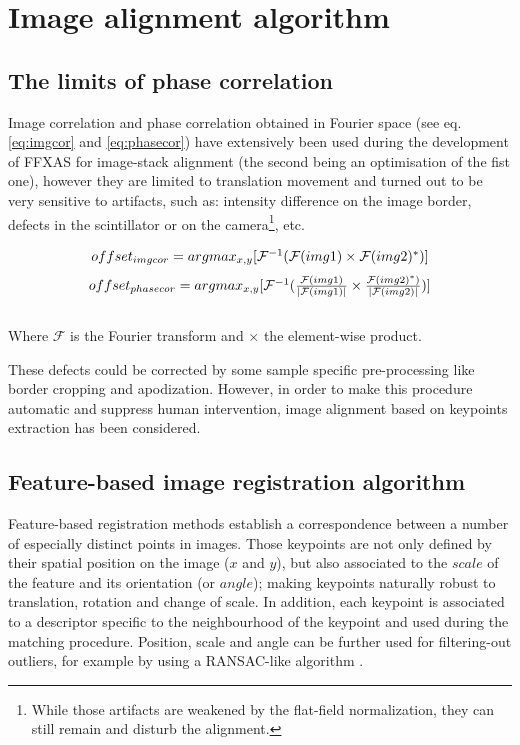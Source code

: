 \documentclass[preprint]{iucr}
\begin{document}
\section{Image alignment algorithm}

\subsection{The limits of phase correlation}

Image correlation and phase correlation obtained in Fourier space (see eq.
\ref{eq:imgcor} and \ref{eq:phasecor}) have
extensively been used during the development of FFXAS for image-stack alignment
(the second being an optimisation of the fist one), however they are
limited to translation movement and turned out to be very sensitive to artifacts, such as:
intensity difference on the image border, defects in the
scintillator or on the camera\footnote{While those artifacts are weakened by
the flat-field normalization, they can still remain and disturb the alignment.},
etc.

\begin{center}
\begin{equation}
\label{eq:imgcor}
$$offset_{img cor} =
argmax_{x,y}[\mathcal{F}^{-1}(\mathcal{F}(img1)\times\mathcal{F}(img2)^*)]$$
\end{equation}
\begin{equation}
\label{eq:phasecor}
$$offset_{phase cor} =
argmax_{x,y}[\mathcal{F}^{-1}(\frac{\mathcal{F}(img1)}{|\mathcal{F}(img1)|}
\times\frac{\mathcal{F}(img2)^*)}{|\mathcal{F}(img2)|})]$$
\end{equation}
\\Where $\mathcal{F}$ is the Fourier transform and $\times$ the element-wise
product.
\end{center}

These defects could be corrected by some sample
specific pre-processing like border cropping and apodization.
However, in order to make this procedure automatic and suppress human
intervention, image alignment based on keypoints extraction has been
considered.

\subsection{Feature-based image registration algorithm}

Feature-based registration methods establish a correspondence between a
number of especially distinct points in images.
Those keypoints are not only defined by their spatial position on the image
($x$ and $y$), but also associated to the $scale$ of the feature and its
orientation (or $angle$);
making keypoints naturally robust to
translation, rotation and change of scale.
In addition, each keypoint is associated to a descriptor specific to the
neighbourhood of the keypoint and used during the matching procedure. Position,
scale and angle can be further used for filtering-out outliers, for example by
using a RANSAC-like algorithm \cite{orsa}.
\end{document}
